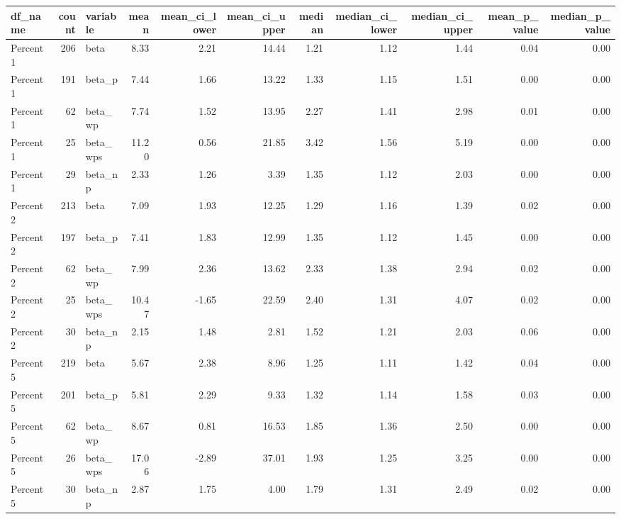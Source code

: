 \begin{tabular}{lrlrrrrrrrr}
  \hline
df\_name & count & variable & mean & mean\_ci\_lower & mean\_ci\_upper & median & median\_ci\_lower & median\_ci\_upper & mean\_p\_value & median\_p\_value \\ 
  \hline
  Percent1 & 206 & beta 		& 8.33 & 2.21 & 14.44 & 1.21 & 1.12 & 1.44 & 0.04 & 0.00 \\ 
  Percent1 & 191 & beta\_p 		& 7.44 & 1.66 & 13.22 & 1.33 & 1.15 & 1.51 & 0.00 & 0.00 \\ 
  Percent1 &  62 & beta\_wp 	& 7.74 & 1.52 & 13.95 & 2.27 & 1.41 & 2.98 & 0.01 & 0.00 \\ 
  Percent1 &  25 & beta\_wps 	& 11.20 & 0.56 & 21.85 & 3.42 & 1.56 & 5.19 & 0.00 & 0.00 \\ 
  Percent1 &  29 & beta\_np 	& 2.33 & 1.26 & 3.39 & 1.35 & 1.12 & 2.03 & 0.00 & 0.00 \\ 
  Percent2 & 213 & beta 		& 7.09 & 1.93 & 12.25 & 1.29 & 1.16 & 1.39 & 0.02 & 0.00 \\ 
  
  Percent2 & 197 & beta\_p & 7.41 & 1.83 & 12.99 & 1.35 & 1.12 & 1.45 & 0.00 & 0.00 \\ 
  Percent2 &  62 & beta\_wp & 7.99 & 2.36 & 13.62 & 2.33 & 1.38 & 2.94 & 0.02 & 0.00 \\ 
  Percent2 &  25 & beta\_wps & 10.47 & -1.65 & 22.59 & 2.40 & 1.31 & 4.07 & 0.02 & 0.00 \\ 
  Percent2 &  30 & beta\_np & 2.15 & 1.48 & 2.81 & 1.52 & 1.21 & 2.03 & 0.06 & 0.00 \\ 
  Percent5 & 219 & beta & 5.67 & 2.38 & 8.96 & 1.25 & 1.11 & 1.42 & 0.04 & 0.00 \\ 
  Percent5 & 201 & beta\_p & 5.81 & 2.29 & 9.33 & 1.32 & 1.14 & 1.58 & 0.03 & 0.00 \\ 
  Percent5 &  62 & beta\_wp & 8.67 & 0.81 & 16.53 & 1.85 & 1.36 & 2.50 & 0.00 & 0.00 \\ 
  Percent5 &  26 & beta\_wps & 17.06 & -2.89 & 37.01 & 1.93 & 1.25 & 3.25 & 0.00 & 0.00 \\ 
  Percent5 &  30 & beta\_np & 2.87 & 1.75 & 4.00 & 1.79 & 1.31 & 2.49 & 0.02 & 0.00 \\ 
   \hline
\end{tabular}
